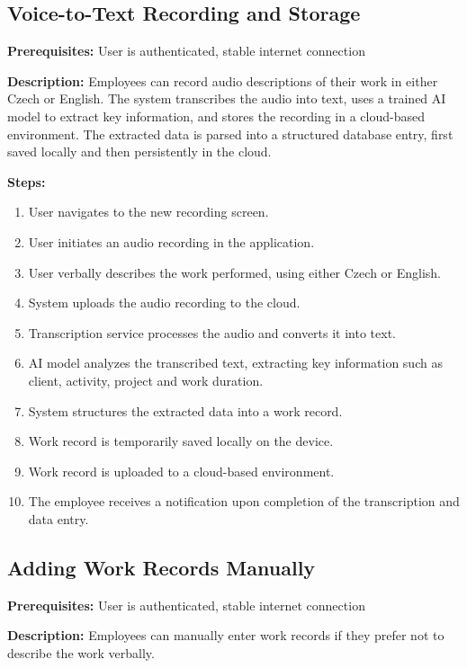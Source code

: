 \documentclass[
  digital,     %
  oneside,     %
  nosansbold,  %
  nocolorbold, %
  lof,         %
  lot,         %
]{fithesis4}
\begin{document}
\subsection{Voice-to-Text Recording and Storage}

\noindent \textbf{Prerequisites:} User is authenticated, stable internet connection

\noindent \textbf{Description:}  
Employees can record audio descriptions of their work in either Czech or English. The system transcribes the audio into text, uses a trained AI model to extract key information, and stores the recording in a cloud-based environment. The extracted data is parsed into a structured database entry, first saved locally and then persistently in the cloud.

\noindent \textbf{Steps:}
\begin{enumerate}
    \item User navigates to the new recording screen.
    \item User initiates an audio recording in the application.
    \item User verbally describes the work performed, using either Czech or English.
    \item System uploads the audio recording to the cloud.
    \item Transcription service processes the audio and converts it into text.
    \item AI model analyzes the transcribed text, extracting key information such as client, activity, project and work duration.
    \item System structures the extracted data into a work record.
    \item Work record is temporarily saved locally on the device.
    \item Work record is uploaded to a cloud-based environment.
    \item The employee receives a notification upon completion of the transcription and data entry.
\end{enumerate}

\subsection{Adding Work Records Manually}

\noindent \textbf{Prerequisites:} User is authenticated, stable internet connection

\noindent \textbf{Description:}  
Employees can manually enter work records if they prefer not to describe the work verbally.
\end{document}
